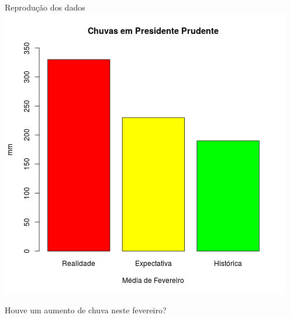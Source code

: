 \documentclass{beamer}
\begin{document}
\begin{frame}{Reprodução dos dados}
  \centering \includegraphics[height=.85\textheight]{Revisao1/materia2}

Houve um aumento de chuva neste fevereiro?
\end{frame}
\end{document}
